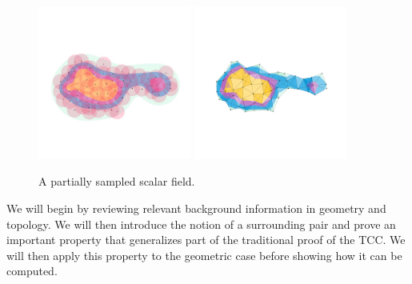 \begin{figure}[htbp]
  \centering
  \includegraphics[trim=0 500 0 500, clip, width=0.45\textwidth]{figures/partial5/cover-comp.pdf}
  \includegraphics[trim=0 500 0 500, clip, width=0.45\textwidth]{figures/partial5/complex_nosurf.pdf}
  \caption{A partially sampled scalar field.}\label{fig:main}
\end{figure}

We will begin by reviewing relevant background information in geometry and topology.
We will then introduce the notion of a surrounding pair and prove an important property that generalizes part of the traditional proof of the TCC.
We will then apply this property to the geometric case before showing how it can be computed.

